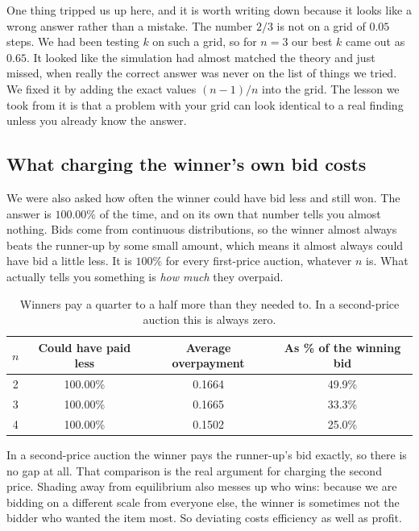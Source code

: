 \documentclass[10pt,a4paper]{article}
\begin{document}
One thing tripped us up here, and it is worth writing down because it looks like a wrong
answer rather than a mistake. The number $2/3$ is not on a grid of $0.05$ steps. We had
been testing $k$ on such a grid, so for $n = 3$ our best $k$ came out as $0.65$. It looked
like the simulation had almost matched the theory and just missed, when really the correct
answer was never on the list of things we tried. We fixed it by adding the exact values
$(n-1)/n$ into the grid. The lesson we took from it is that a problem with your grid can
look identical to a real finding unless you already know the answer.

\subsection{What charging the winner's own bid costs}

We were also asked how often the winner could have bid less and still won. The answer is
$100.00\%$ of the time, and on its own that number tells you almost nothing. Bids come from
continuous distributions, so the winner almost always beats the runner-up by some small
amount, which means it almost always could have bid a little less. It is $100\%$ for every
first-price auction, whatever $n$ is. What actually tells you something is \emph{how much}
they overpaid.

\begin{table}[h]
\centering
\small
\begin{tabular}{cccc}
\toprule
$n$ & Could have paid less & Average overpayment & As \% of the winning bid \\
\midrule
2 & 100.00\% & 0.1664 & 49.9\% \\
3 & 100.00\% & 0.1665 & 33.3\% \\
4 & 100.00\% & 0.1502 & 25.0\% \\
\bottomrule
\end{tabular}
\caption{Winners pay a quarter to a half more than they needed to. In a second-price
auction this is always zero.}
\end{table}

In a second-price auction the winner pays the runner-up's bid exactly, so there is no gap at
all. That comparison is the real argument for charging the second price. Shading away from
equilibrium also messes up who wins: because we are bidding on a different scale from
everyone else, the winner is sometimes not the bidder who wanted the item most. So
deviating costs efficiency as well as profit.
\end{document}
